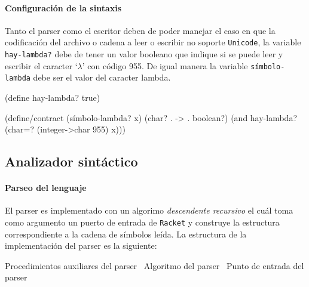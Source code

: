 \documentclass[10pt,oneside,openany,letterpaper]{book}
\begin{document}
\paragraph{Configuración de la sintaxis} Tanto el parser como el escritor deben de poder manejar el caso en que la codificación del archivo o cadena a leer o escribir no soporte {\tt{}Unicode}, la variable {\tt{}\protect{}\protect{}hay-lambda?} debe de tener un valor booleano que indique si se puede leer y escribir el caracter `\( \lambda \)' con código 955. De igual manera la variable {\tt{}símbolo-lambda} debe ser el valor del caracter lambda.

\nwenddocs{}\endmoddef
(define hay-lambda? true)

(define/contract (símbolo-lambda? x)
  (char? . -> . boolean?)
  (and hay-lambda? (char=? (integer->char 955) x)))
\eatline
{}\nwendcode{}\nwdocspar
\subsection{Analizador sintáctico}

\paragraph{Parseo del lenguaje} El parser es implementado con un algorimo \emph{descendente recursivo} el cuál toma como argumento un puerto de entrada de {\tt{}Racket} y construye la estructura correspondiente a la cadena de símbolos leída. La estructura de la implementación del parser es la siguiente:

\nwenddocs{}\endmoddef
\LA{}Procedimientos auxiliares del parser~{\nwtagstyle{}}\RA{}
\LA{}Algoritmo del parser~{\nwtagstyle{}}\RA{}
\LA{}Punto de entrada del parser~{\nwtagstyle{}}\RA{}
\nwendcode{}\nwdocspar
\end{document}
